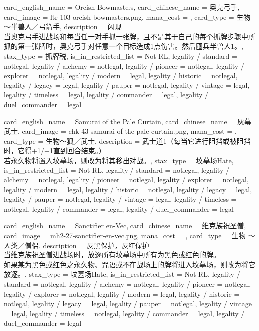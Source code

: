 \documentclass[lang = cn, color = black, 10pt]{AllThatStax}
\begin{document}
\card
{
	card_english_name = {Orcish Bowmasters},
	card_chinese_name = {奥克弓手},
	card_image = ltr-103-orcish-bowmasters.png,
	mana_cost = ,
	card_type = 生物 ～半兽人／弓箭手,
	description = {闪现\\
		当奥克弓手进战场和每当任一对手抓一张牌，且不是其于自己的每个抓牌步骤中所抓的第一张牌时，奥克弓手对任意一个目标造成1点伤害。然后囤兵半兽人1。},
	stax_type = 抓牌税,
	is_in_restricted_list = Not RL,
	legality / standard = notlegal,
	legality / alchemy = notlegal,
	legality / pioneer = notlegal,
	legality / explorer = notlegal,
	legality / modern = legal,
	legality / historic = notlegal,
	legality / legacy = legal,
	legality / pauper = notlegal,
	legality / vintage = legal,
	legality / timeless = legal,
	legality / commander = legal,
	legality / duel_commander = legal
}

\card
{
	card_english_name = {Samurai of the Pale Curtain},
	card_chinese_name = {灰幕武士},
	card_image = chk-43-samurai-of-the-pale-curtain.png,
	mana_cost = ,
	card_type = 生物～狐／武士,
	description = {武士道1（每当它进行阻挡或被阻挡时，它得+1/+1直到回合结束。）\\
		若永久物将置入坟墓场，则改为将其移出对战。},
	stax_type = 坟墓场Hate,
	is_in_restricted_list = Not RL,
	legality / standard = notlegal,
	legality / alchemy = notlegal,
	legality / pioneer = notlegal,
	legality / explorer = notlegal,
	legality / modern = legal,
	legality / historic = notlegal,
	legality / legacy = legal,
	legality / pauper = notlegal,
	legality / vintage = legal,
	legality / timeless = notlegal,
	legality / commander = legal,
	legality / duel_commander = legal
}

\card
{
	card_english_name = {Sanctifier en-Vec},
	card_chinese_name = {维克族祝圣僧},
	card_image = mh2-27-sanctifier-en-vec.png,
	mana_cost = ,
	card_type = 生物 ～人类／僧侣,
	description = {反黑保护，反红保护\\
		当维克族祝圣僧进战场时，放逐所有坟墓场中所有为黑色或红色的牌。\\
		如果某为黑色或红色之永久物、咒语或不在战场上的牌将进入坟墓场，则改为将它放逐。},
	stax_type = 坟墓场Hate,
	is_in_restricted_list = Not RL,
	legality / standard = notlegal,
	legality / alchemy = notlegal,
	legality / pioneer = notlegal,
	legality / explorer = notlegal,
	legality / modern = legal,
	legality / historic = notlegal,
	legality / legacy = legal,
	legality / pauper = notlegal,
	legality / vintage = legal,
	legality / timeless = notlegal,
	legality / commander = legal,
	legality / duel_commander = legal
}
\end{document}
